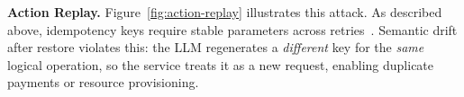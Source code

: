 \documentclass[sigplan,nonacm]{acmart}
\begin{document}
%
%
%
%
%
%
%
%
%
%
%

\textbf{Action Replay.}\label{sec:v1} Figure~\ref{fig:action-replay} illustrates this attack. As described above, idempotency keys require stable parameters across retries~\cite{stripe_idempotent_requests, aws_ecs_idempotency}. Semantic drift after restore violates this: the LLM regenerates a \emph{different} key for the \emph{same} logical operation, so the service treats it as a new request, enabling duplicate payments or resource provisioning.
\end{document}

